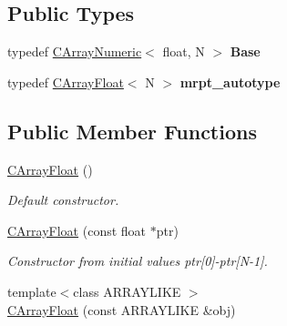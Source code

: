 \subsection*{Public Types}
\begin{DoxyCompactItemize}
\item 
typedef \hyperlink{classydlidar_1_1math_1_1_c_array_numeric}{C\+Array\+Numeric}$<$ float, N $>$ {\bfseries Base}\hypertarget{classydlidar_1_1math_1_1_c_array_float_a6f1ccceb0bdf78102fac201993830293}{}\label{classydlidar_1_1math_1_1_c_array_float_a6f1ccceb0bdf78102fac201993830293}

\item 
typedef \hyperlink{classydlidar_1_1math_1_1_c_array_float}{C\+Array\+Float}$<$ N $>$ {\bfseries mrpt\+\_\+autotype}\hypertarget{classydlidar_1_1math_1_1_c_array_float_a93e163dbc726f4657d8707a881c46942}{}\label{classydlidar_1_1math_1_1_c_array_float_a93e163dbc726f4657d8707a881c46942}

\end{DoxyCompactItemize}
\subsection*{Public Member Functions}
\begin{DoxyCompactItemize}
\item 
\hyperlink{classydlidar_1_1math_1_1_c_array_float_a4a2df0319e2fa91cac2e9b873b48260a}{C\+Array\+Float} ()\hypertarget{classydlidar_1_1math_1_1_c_array_float_a4a2df0319e2fa91cac2e9b873b48260a}{}\label{classydlidar_1_1math_1_1_c_array_float_a4a2df0319e2fa91cac2e9b873b48260a}

\begin{DoxyCompactList}\small\item\em Default constructor. \end{DoxyCompactList}\item 
\hyperlink{classydlidar_1_1math_1_1_c_array_float_a28faff4a356995321ae13119bf0090d2}{C\+Array\+Float} (const float $\ast$ptr)\hypertarget{classydlidar_1_1math_1_1_c_array_float_a28faff4a356995321ae13119bf0090d2}{}\label{classydlidar_1_1math_1_1_c_array_float_a28faff4a356995321ae13119bf0090d2}

\begin{DoxyCompactList}\small\item\em Constructor from initial values ptr\mbox{[}0\mbox{]}-\/ptr\mbox{[}N-\/1\mbox{]}. \end{DoxyCompactList}\item 
{\footnotesize template$<$class A\+R\+R\+A\+Y\+L\+I\+KE $>$ }\\\hyperlink{classydlidar_1_1math_1_1_c_array_float_a228d76467ef7680d5bd31ccf8351738d}{C\+Array\+Float} (const A\+R\+R\+A\+Y\+L\+I\+KE \&obj)
\end{DoxyCompactItemize}


